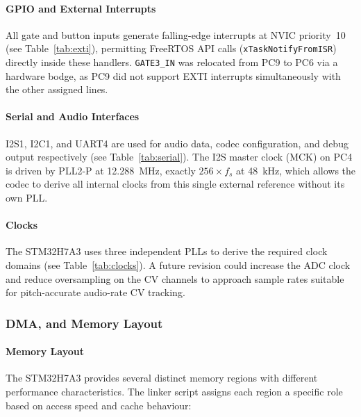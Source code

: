 \paragraph{GPIO and External Interrupts}
All gate and button inputs generate falling-edge interrupts at \ac{NVIC} priority~10 (see Table~\ref{tab:exti}), permitting FreeRTOS API calls (\texttt{xTaskNotifyFromISR}) directly inside these handlers.
\texttt{GATE3\_IN} was relocated from PC9 to PC6 via a hardware bodge, as PC9 did not support EXTI interrupts simultaneously with the other assigned lines.

\paragraph{Serial and Audio Interfaces}
I2S1, I2C1, and UART4 are used for audio data, codec configuration, and debug output respectively (see Table~\ref{tab:serial}).
The I2S master clock (\ac{MCK}) on PC4 is driven by PLL2-P at \SI{12.288}{\mega\hertz}, exactly $256 \times f_s$ at \SI{48}{\kilo\hertz}, which allows the codec to derive all internal clocks from this single external reference without its own \ac{PLL}.

\paragraph{Clocks}
The STM32H7A3 uses three independent PLLs to derive the required clock domains (see Table~\ref{tab:clocks}).
A future revision could increase the ADC clock and reduce oversampling on the CV channels to approach sample rates suitable for pitch-accurate audio-rate CV tracking.

\newpage
\subsubsection{DMA, and Memory Layout}
\paragraph{Memory Layout}

The STM32H7A3 provides several distinct memory regions with different performance  characteristics. 
The linker script assigns each region a specific role based on access speed and cache behaviour:

